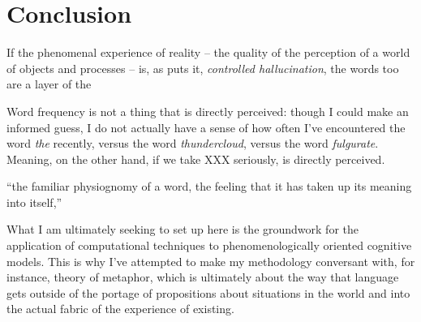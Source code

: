 \chapter{Conclusion}

If the phenomenal experience of reality -- the quality of the perception of a world of objects and processes -- is, as \cite{Clark} puts it, \emph{controlled hallucination}, the words too are a layer of the 

Word frequency is not a thing that is directly perceived: though I could make an informed guess, I do not actually have a sense of how often I've encountered the word \emph{the} recently, versus the word \emph{thundercloud}, versus the word \emph{fulgurate}.  Meaning, on the other hand, if we take XXX seriously, is directly perceived.

``the familiar physiognomy of a word, the feeling that it has taken up its meaning into itself,'' \citep[][p. 218]{Wittgenstein}

What I am ultimately seeking to set up here is the groundwork for the application of computational techniques to phenomenologically oriented cognitive models.  This is why I've attempted to make my methodology conversant with, for instance, \cite{Davidson1978} theory of metaphor, which is ultimately about the way that language gets outside of the portage of propositions about situations in the world and into the actual fabric of the experience of existing.
